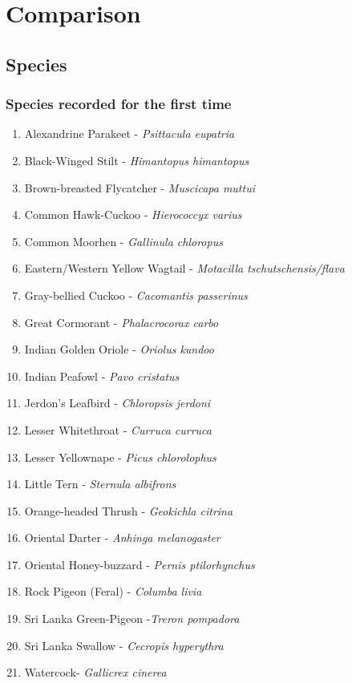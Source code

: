 \chapter{Comparison}
\label{cp:Comparative}
\section{Species}
\begin{importantbox}
\subsection{Species recorded for the first time}
\begin{enumerate}
 \item Alexandrine Parakeet - \textit{Psittacula eupatria}
    \item Black-Winged Stilt - \textit{Himantopus himantopus}
    \item Brown-breasted Flycatcher - \textit{Muscicapa muttui}
    \item Common Hawk-Cuckoo - \textit{Hierococcyx varius}
    \item Common Moorhen - \textit{Gallinula chloropus}
    \item Eastern/Western Yellow Wagtail - \textit{Motacilla tschutschensis/flava}
    \item Gray-bellied Cuckoo - \textit{Cacomantis passerinus}
    \item Great Cormorant - \textit{Phalacrocorax carbo}
    \item Indian Golden Oriole - \textit{Oriolus kundoo}
    \item Indian Peafowl - \textit{Pavo cristatus}
    \item Jerdon's Leafbird - \textit{Chloropsis jerdoni}
     \item Lesser Whitethroat - \textit{Curruca curruca}
     \item Lesser Yellownape - \textit{Picus chlorolophus}
    \item Little Tern - \textit{Sternula albifrons}
     \item Orange-headed Thrush - \textit{Geokichla citrina}
    \item Oriental Darter - \textit{Anhinga melanogaster}
    \item Oriental Honey-buzzard - \textit{Pernis ptilorhynchus}
    \item Rock Pigeon (Feral) - \textit{Columba livia}
    \item Sri Lanka Green-Pigeon -\textit{Treron pompadora}
    \item Sri Lanka Swallow - \textit{Cecropis hyperythra}
    \item Watercock- \textit{Gallicrex cinerea}
\end{enumerate}
\end{importantbox}

